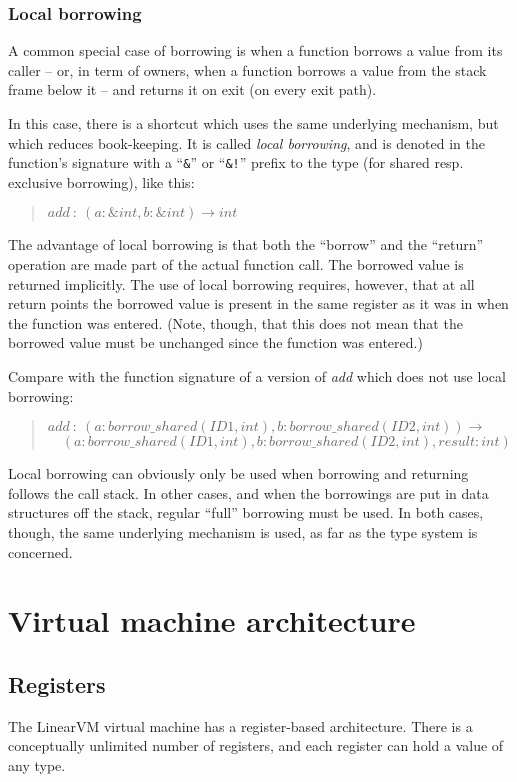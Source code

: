 \documentclass[a4paper]{book}
\newcommand\FuncSignature[2]{\begin{quote}$\mathit{#1}\ :\ \mathit{#2}$\end{quote}}
\newcommand\FuncSignatureII[3]{\begin{quote}$\mathit{#1}\ :\ \mathit{#2} \to$\\${}\quad \mathit{#3}$ \end{quote}}
\begin{document}
\subsection{Local borrowing} %
\label{sec:design-local-borrowing}
A common special case of borrowing is when a function borrows a value
from its caller -- or, in term of owners, when a function borrows a value from
the stack frame below it -- and returns it on exit (on every exit path).

In this case, there is a shortcut which uses the same underlying mechanism,
but which reduces book-keeping.
It is called \emph{local borrowing}, and
is denoted in the function's signature with a ``\texttt{\&}'' or
``\texttt{\&!}'' prefix to the type (for shared resp. exclusive
borrowing), like this:
\FuncSignature{add}{(a:\&int, b:\&int) \to int}

The advantage of local borrowing is that both the ``borrow'' and the
``return'' operation are made part of the actual function call.
The borrowed value is returned implicitly. The use of local borrowing requires,
however, that at all return points the borrowed value is present in the
same register as it was in when the function was entered.
(Note, though, that this does not mean that the borrowed value must be
unchanged since the function was entered.)

Compare with the function signature of a version of \emph{add} which does
not use local borrowing:

\FuncSignatureII{add}
{(a:borrow\_shared(ID1,int), b:borrow\_shared(ID2,int))}
{(a:borrow\_shared(ID1,int), b:borrow\_shared(ID2,int), result:int)}

Local borrowing can obviously only be used when borrowing and returning
follows the call stack. In other cases, and when the borrowings are
put in data structures off the stack, regular ``full'' borrowing must be used.
In both cases, though, the same underlying mechanism is used, as far
as the type system is concerned.

\chapter{Virtual machine architecture}

\section{Registers}
The LinearVM virtual machine has a register-based architecture.
There is a conceptually unlimited number of registers, and each
register can hold a value of any type.
\end{document}

